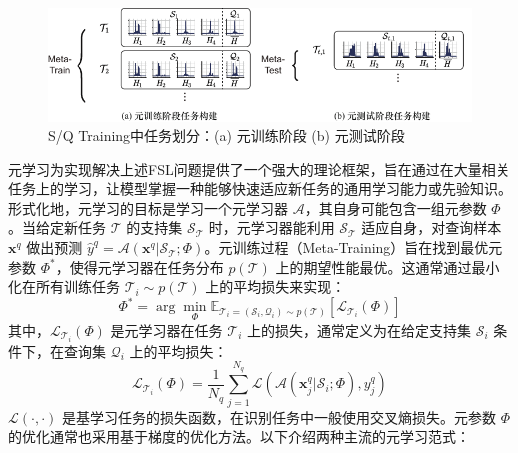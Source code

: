 \begin{figure}[h]
    \centering
    \includegraphics[width=\linewidth]{figures/sq.pdf}
    \caption{S/Q Training中任务划分：(a) 元训练阶段 (b) 元测试阶段}
    \label{fig:highres}
\end{figure}

元学习为实现解决上述FSL问题提供了一个强大的理论框架，旨在通过在大量相关任务上的学习，让模型掌握一种能够快速适应新任务的通用学习能力或先验知识。形式化地，元学习的目标是学习一个元学习器 $\mathcal{A}$，其自身可能包含一组元参数 $\Phi$。当给定新任务 $\mathcal{T}$ 的支持集 $\mathcal{S}_{\mathcal{T}}$ 时，元学习器能利用 $\mathcal{S}_{\mathcal{T}}$ 适应自身，对查询样本 $\mathbf{x}^q$ 做出预测 $\hat{y}^q = \mathcal{A}(\mathbf{x}^q | \mathcal{S}_{\mathcal{T}}; \Phi)$。元训练过程（Meta-Training）旨在找到最优元参数 $\Phi^*$，使得元学习器在任务分布 $p(\mathcal{T})$ 上的期望性能最优。这通常通过最小化在所有训练任务 $\mathcal{T}_i \sim p(\mathcal{T})$ 上的平均损失来实现：
\begin{equation}
    \Phi^* = \arg\min_{\Phi} \mathbb{E}_{\mathcal{T}_i=(\mathcal{S}_i, \mathcal{Q}_i) \sim p(\mathcal{T})} [\mathcal{L}_{\mathcal{T}_i}(\Phi)]
    \label{eq:meta_objective}
\end{equation}
其中，$\mathcal{L}_{\mathcal{T}_i}(\Phi)$ 是元学习器在任务 $\mathcal{T}_i$ 上的损失，通常定义为在给定支持集 $\mathcal{S}_i$ 条件下，在查询集 $\mathcal{Q}_i$ 上的平均损失：
\begin{equation}
    \mathcal{L}_{\mathcal{T}_i}(\Phi) = \frac{1}{N_q} \sum_{j=1}^{N_q} \mathcal{L}( \mathcal{A}(\mathbf{x}_j^q | \mathcal{S}_i; \Phi), y_j^q )
    \label{eq:task_loss_meta}
\end{equation}
$\mathcal{L}(\cdot, \cdot)$ 是基学习任务的损失函数，在识别任务中一般使用交叉熵损失。元参数 $\Phi$ 的优化通常也采用基于梯度的优化方法。以下介绍两种主流的元学习范式：

